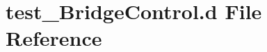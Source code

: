 \hypertarget{test___bridge_control_8d}{}\section{test\+\_\+\+Bridge\+Control.\+d File Reference}
\label{test___bridge_control_8d}
